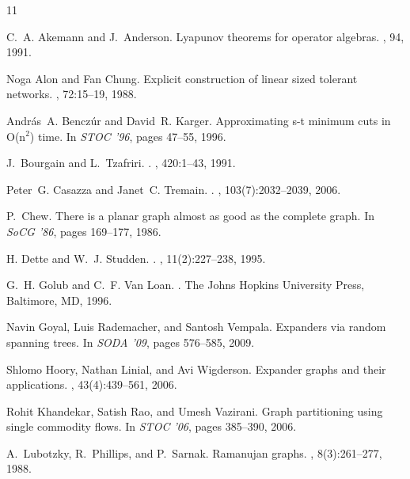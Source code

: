 \documentclass[12pt]{article}
\begin{document}
\begin{thebibliography}{11}

C.~A. Akemann and J.~Anderson.
\newblock Lyapunov theorems for operator algebras.
, 94, 1991.

Noga Alon and Fan Chung.
\newblock Explicit construction of linear sized tolerant networks.
, 72:15--19, 1988.

Andr{\'a}s~A. Bencz{\'u}r and David~R. Karger.
\newblock Approximating s-t minimum cuts in {O}(n{$^{2}$}) time.
\newblock In {\em STOC '96}, pages 47--55, 1996.

J.~Bourgain and L.~Tzafriri.
.
, 420:1--43, 1991.

Peter~G. Casazza and Janet~C. Tremain.
.
, 103(7):2032--2039, 2006.

P.~Chew.
\newblock There is a planar graph almost as good as the complete graph.
\newblock In {\em SoCG '86}, pages 169--177, 1986.

H. Dette and W.~J. Studden.
.
, 11(2):227--238, 1995.

G.~H. Golub and C.~F. {Van Loan}.
.
\newblock The Johns Hopkins University Press, Baltimore, MD, 1996.

Navin Goyal, Luis Rademacher, and Santosh Vempala.
\newblock Expanders via random spanning trees.
\newblock In {\em SODA '09}, pages 576--585, 2009.

Shlomo Hoory, Nathan Linial, and Avi Wigderson.
\newblock Expander graphs and their applications.
, 43(4):439--561,
  2006.

Rohit Khandekar, Satish Rao, and Umesh Vazirani.
\newblock Graph partitioning using single commodity flows.
\newblock In {\em STOC '06}, pages 385--390, 2006.

A.~Lubotzky, R.~Phillips, and P.~Sarnak.
\newblock Ramanujan graphs.
, 8(3):261--277, 1988.


\end{thebibliography}
\end{document}
